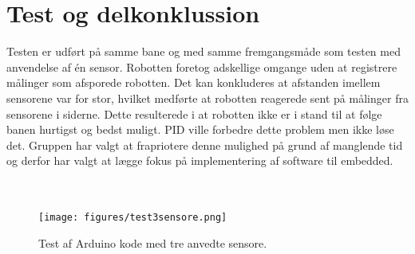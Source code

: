 \section{Test og delkonklussion}
Testen er udført på samme bane og med samme fremgangsmåde som testen med anvendelse af én sensor. Robotten foretog adskellige omgange uden at registrere målinger som afsporede robotten. Det kan konkluderes at afstanden imellem sensorene var for stor, hvilket medførte at robotten reagerede sent på målinger fra sensorene i siderne. Dette resulterede i at robotten ikke er i stand til at følge banen hurtigst og bedst muligt. 
PID ville forbedre dette problem men ikke løse det. Gruppen har valgt at frapriotere denne mulighed på grund af manglende tid og derfor har valgt at lægge fokus på implementering af software til embedded. 
\\
\\
\\
\begin{figure}[h!]
  \centering
  \texttt{[image: figures/test3sensore.png]}
  \caption{Test af Arduino kode med tre anvedte sensore.}
  \label{test_3_sensore}
\end{figure}




